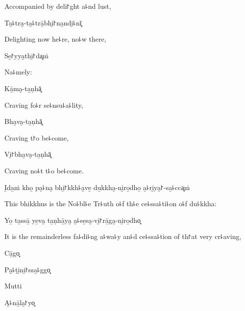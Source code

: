 \begin{english}
  Accompanied by deli꜓ght a꜕nd lust,
\end{english}

Ta̱꜕tra̮-ta̱꜕trā̱bhi̮꜓na̱ndi̮꜕nī͓

\begin{english}
  Delighting now he꜕re, no꜕w there,
\end{english}

Se̱꜓yya̮thī̱꜓da͓ṁ

\begin{english}
  Na꜕mely:
\end{english}

\ifaivedition
\clearpage
\fi

Kā̱ma̮-ta̱ṇhā͓

\begin{english}
  Craving fo꜕r se꜕nsu꜕a꜕lity,
\end{english}

Bha̮va̮-ta̱ṇhā͓

\begin{english}
  Craving t꜓o be꜕come,
\end{english}

Vi̮꜓bha̮va̮-ta̱ṇhā͓

\begin{english}
  Craving no꜕t t꜕o be꜕come.
\end{english}

I̮da̱ṁ kho̱ pa̮꜕na̮ bhi̱꜓kkh꜕a̮ve̱ du̱kkha̮-ni̮ro̱dho̱ a̮꜕ri̮ya̮꜓-sa̱꜕cca͓ṁ

\begin{english}
  This bhikkhus is the No꜕bl꜕e Tr꜕uth o꜕f th꜕e ce꜕ssa꜕ti꜕on o꜕f du꜕kkha:
\end{english}

Yo̱ ta̱ssā̱ ye̱va̮ ta̱ṇhā̱ya̮ a̮꜕se̱sa̮-vi̮꜓rā̱ga̮-ni̮ro̱dho͓

\begin{english}
  It is the remainderless fa꜕di꜕ng a꜕wa꜕y an꜕d ce꜕ssa꜕tion of th꜓at very cr꜕aving,
\end{english}

Cā̱go͓


Pa̮꜕ṭi̮ni̱꜓ssa̱꜕ggo͓


Mutti


A̮꜕nā̱la̮꜓yo͓


